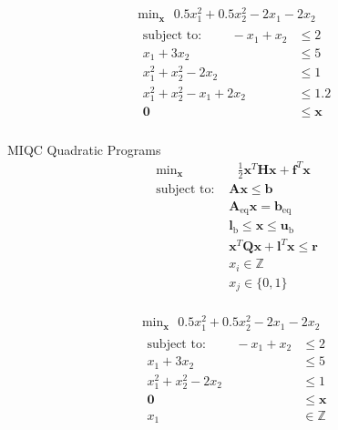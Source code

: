 \documentclass{article}
\begin{document}
\begin{align*}
    \text{min}_{\mathbf{x}} \text{ } 0.5x_1^2 + 0.5x_2^2 - 2x_1 - 2x_2\\
    \begin{aligned}
    \mbox{subject to: } \qquad -x_1 + x_2 &\le 2\\
                        x_1 + 3x_2 &\le 5\\
                        x_1^2 + x_2^2 - 2x_2 &\le 1\\
                        x_1^2 + x_2^2 - x_1 + 2x_2 &\le 1.2\\
                        \mathbf{0} &\le \mathbf{x}\\
    \end{aligned}
\end{align*}


MIQC Quadratic Programs
\begin{align*}
    \text{min}_{\mathbf{x}}& \text{ } \frac{1}{2}\mathbf{x}^T \mathbf{H} \mathbf{x} + \mathbf{f}^T \mathbf{x} \\
    \mbox{subject to: }& \mathbf{A}\mathbf{x} \le \mathbf{b}\\
                       & \mathbf{A}_\text{eq}\mathbf{x} = \mathbf{b}_\text{eq}\\
                       & \mathbf{l}_{\text{b}} \le \mathbf{x} \le \mathbf{u}_{\text{b}}\\
                       & \mathbf{x}^T \mathbf{Q} \mathbf{x} + \mathbf{l}^T \mathbf{x} \le \mathbf{r}\\
                       & x_i \in \mathbb{Z}\\
                       & x_j \in \{0,1\}\\
\end{align*}

\begin{align*}
    \text{min}_{\mathbf{x}} \text{ } 0.5x_1^2 + 0.5x_2^2 - 2x_1 - 2x_2\\
    \begin{aligned}
    \mbox{subject to: } \qquad -x_1 + x_2 &\le 2\\
                        x_1 + 3x_2 &\le 5\\
                        x_1^2 + x_2^2 - 2x_2 &\le 1\\
                        \mathbf{0} &\le \mathbf{x}\\
                        x_1 &\in \mathbb{Z}
    \end{aligned}
\end{align*}
\end{document}
